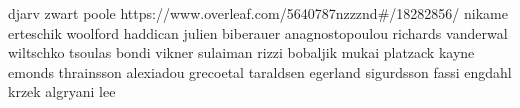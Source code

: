 djarv
zwart
poole  https://www.overleaf.com/5640787nzzznd#/18282856/ 
nikame
erteschik
woolford
haddican
julien
biberauer
anagnostopoulou
richards
vanderwal
wiltschko
tsoulas
bondi
vikner
sulaiman
rizzi
bobaljik
mukai
platzack
kayne
emonds
thrainsson
alexiadou
grecoetal
taraldsen
egerland
sigurdsson
fassi
engdahl
krzek
algryani
lee